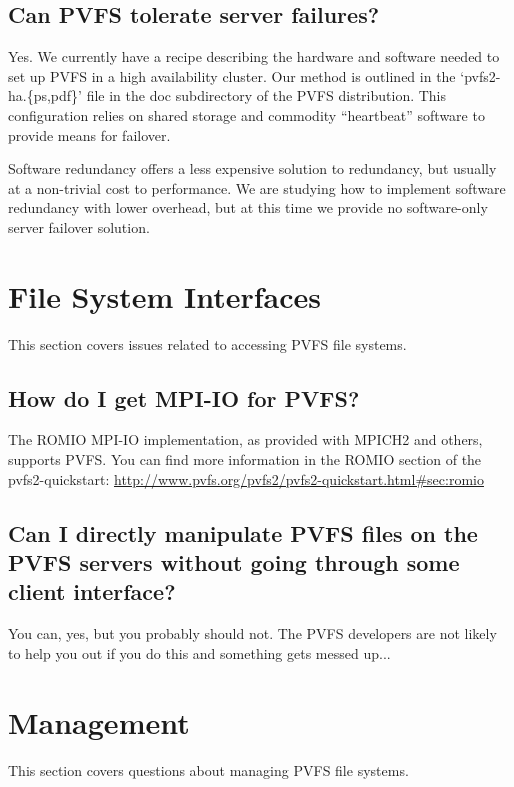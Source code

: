 \documentclass[11pt,letterpaper]{article}
\begin{document}
\subsection{Can PVFS tolerate server failures?}

Yes.  We currently have a recipe describing the hardware and software
needed to set up PVFS in a high availability cluster.  Our method is
outlined in the `pvfs2-ha.\{ps,pdf\}' file in the doc subdirectory of the
PVFS distribution.  This configuration relies on shared storage and
commodity ``heartbeat'' software to provide means for failover.

Software redundancy offers a less expensive solution to redundancy,
but usually at a non-trivial cost to performance.  We are studying how
to implement software redundancy with lower overhead, but at this time
we provide no software-only server failover solution.

%
%
\section{File System Interfaces}

This section covers issues related to accessing PVFS file systems.

\subsection{How do I get MPI-IO for PVFS?}

The ROMIO MPI-IO implementation, as provided with MPICH2 and others, supports
PVFS.  You can find more information in the ROMIO section of the
pvfs2-quickstart: \url{http://www.pvfs.org/pvfs2/pvfs2-quickstart.html\#sec:romio}

\subsection{Can I directly manipulate PVFS files on the PVFS servers
            without going through some client interface?}

You can, yes, but you probably should not.  The PVFS developers are not
likely to help you out if you do this and something gets messed up...

%
%
\section{Management}

This section covers questions about managing PVFS file systems.
\end{document}
